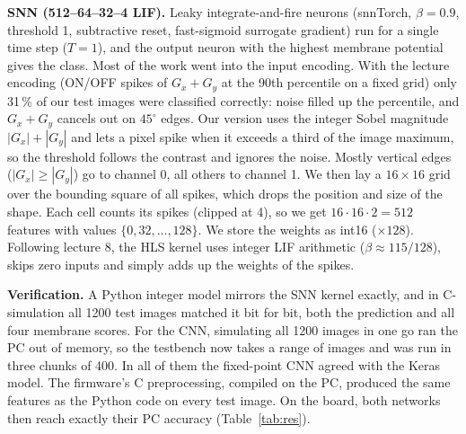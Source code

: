 \documentclass[10pt,a4paper]{article}
\begin{document}
\textbf{SNN (512--64--32--4 LIF).} Leaky integrate-and-fire neurons (snnTorch,
$\beta=0.9$, threshold 1, subtractive reset, fast-sigmoid surrogate gradient) run for a single
time step ($T=1$), and the output neuron with the highest membrane potential gives the class.
Most of the work went into the input encoding. With the lecture encoding (ON/OFF spikes of
$G_x+G_y$ at the 90th percentile on a fixed grid) only 31\,\% of our test images were
classified correctly: noise filled up the percentile, and $G_x+G_y$ cancels out on $45^\circ$
edges. Our version uses the integer Sobel magnitude $|G_x|+|G_y|$ and lets a pixel spike when
it exceeds a third of the image maximum, so the threshold follows the contrast and ignores the
noise. Mostly vertical edges ($|G_x|\ge|G_y|$) go to channel 0, all others to channel 1. We then lay a $16\times16$ grid over the bounding square of all spikes,
which drops the position and size of the shape. Each cell counts its spikes (clipped at 4), so we
get $16\cdot16\cdot2=512$ features with values $\{0,32,\dots,128\}$. We store the weights as
int16 ($\times128$).
Following lecture 8, the HLS kernel uses integer LIF arithmetic ($\beta\approx115/128$),
skips zero inputs and simply adds up the weights of the spikes.

\textbf{Verification.} A Python integer model mirrors the SNN kernel exactly, and in
C-simulation all 1200 test images matched it bit for bit, both the prediction and all four
membrane scores. For the CNN, simulating all 1200 images in one go ran the PC out of memory,
so the testbench now takes a range of images and was run in three chunks of 400. In all of
them the fixed-point CNN agreed with the Keras model. The firmware's C preprocessing, compiled
on the PC, produced the same features as the Python code on every test image. On the board,
both networks then reach exactly their PC accuracy (Table~\ref{tab:res}).

\end{document}
